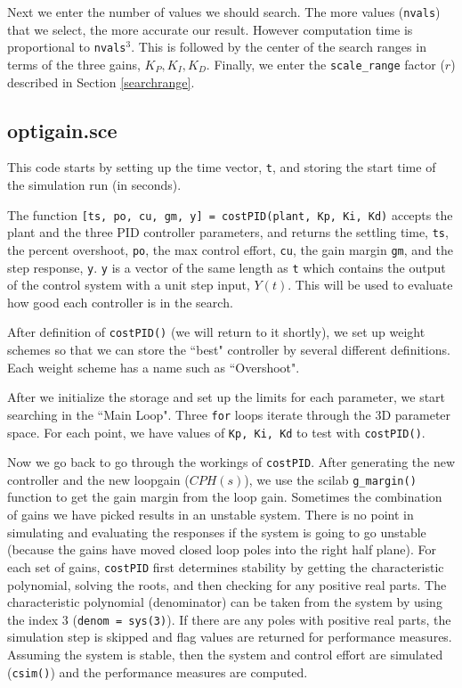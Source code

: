 Next we enter the number of values we should search.  The more values ({\tt nvals}) that we select, the more accurate our result.  However computation time is proportional to {\tt nvals}$^3$.
This is followed by the center of the search ranges in terms of the three gains, $K_P, K_I, K_D$.
Finally, we  enter the {\tt scale\_range} factor ($r$) described in Section \ref{searchrange}.



\subsection{optigain.sce}
This code starts by setting up the time vector, {\tt t}, and storing the start time of the simulation run (in seconds).

The function {\tt [ts, po, cu, gm, y] = costPID(plant, Kp, Ki, Kd)} accepts the plant and the three PID controller parameters, and returns the settling time, {\tt ts},  the percent overshoot, {\tt po}, the max control effort, {\tt cu}, the gain margin {\tt gm}, and the step response, {\tt y}.   {\tt y} is a vector of the same length as {\tt t} which contains the output of the control system with a unit step input, $Y(t)$.  This will be used to evaluate how good each controller is in the search.

After definition of {\tt costPID()} (we will return to it shortly), we set up weight schemes so that we can store the ``best" controller by several different definitions.  Each weight scheme has a name such as ``Overshoot".

After we initialize the storage and set up the limits for each parameter, we start searching in the ``Main Loop".
Three {\tt for} loops iterate through the 3D parameter space. For each point, we have values of {\tt Kp, Ki, Kd} to test with {\tt costPID()}.

Now we go back to go through the workings of {\tt costPID}.   After generating the new controller and the new loopgain ($CPH(s)$), we use the scilab {\tt g\_margin()} function to get the gain margin from the loop gain.
Sometimes the combination of gains we have picked results in an unstable system.
There is no point in simulating and evaluating the responses if the system is going to go unstable (because the gains have moved closed loop poles into the right half plane).
For each set of gains, {\tt costPID}
first determines stability by getting the characteristic polynomial, solving the roots, and then checking for any positive real parts.  The characteristic polynomial (denominator) can be taken from the system by using the index 3 ({\tt denom = sys(3)}).  If there are any poles with positive real parts, the simulation step is skipped and flag values are returned for performance measures.
Assuming the system is stable, then the system and control effort are simulated ({\tt csim()}) and the performance measures are computed.

